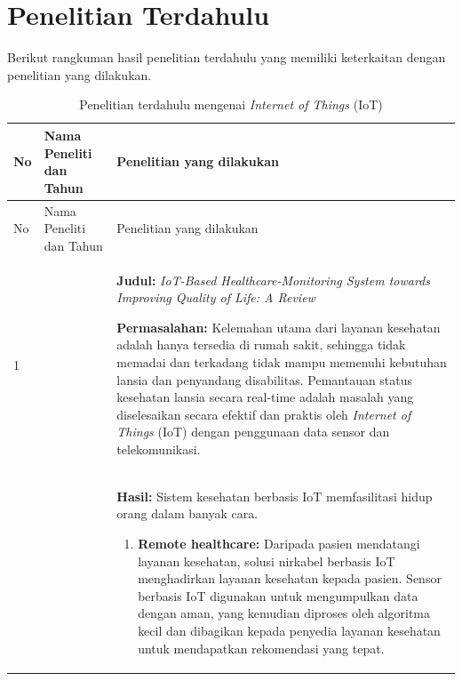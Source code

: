\section{Penelitian Terdahulu}

Berikut rangkuman hasil penelitian terdahulu yang memiliki keterkaitan dengan penelitian yang dilakukan.

\begin{longtable}[!h]
    {
        p{}
        p{}
        p{}
    }
    \caption{Penelitian terdahulu mengenai \textit{Internet of Things} (IoT)}\\

    \hline
        No &
        Nama Peneliti dan Tahun &
        Penelitian yang dilakukan \\ [0.5ex]
    \hline

    \endfirsthead


    \hline
        No &
        Nama Peneliti dan Tahun &
        Penelitian yang dilakukan \\ [0.5ex]
    \hline
    \endhead %
    \hline

    \endfoot
    \hline
    \endlastfoot

        1
        & \textcite{inproc:abdulmalek}
        &
        \textbf{Judul:}
        \textit{IoT-Based Healthcare-Monitoring System towards Improving Quality of Life: A Review}

        \textbf{Permasalahan:}
        Kelemahan utama dari layanan kesehatan adalah hanya tersedia di rumah sakit, sehingga tidak memadai dan terkadang tidak mampu memenuhi kebutuhan lansia dan penyandang disabilitas. Pemantauan status kesehatan lansia secara real-time adalah masalah yang diselesaikan secara efektif dan praktis oleh \textit{Internet of Things} (IoT) dengan penggunaan data sensor dan telekomunikasi.

        \\

        & &
        \textbf{Hasil:}
        Sistem kesehatan berbasis IoT memfasilitasi hidup orang dalam banyak cara.

        \begin{enumerate}
            \item \textbf{Remote healthcare:}
            Daripada pasien mendatangi layanan kesehatan, solusi nirkabel berbasis IoT menghadirkan layanan kesehatan kepada pasien. Sensor berbasis IoT digunakan untuk mengumpulkan data dengan aman, yang kemudian diproses oleh algoritma kecil dan dibagikan kepada penyedia layanan kesehatan untuk mendapatkan rekomendasi yang tepat.


\end{enumerate}
\end{longtable}
